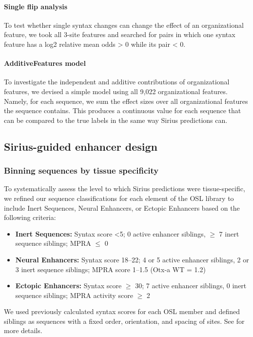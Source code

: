 \paragraph{Single flip analysis}
To test whether single syntax changes can change the effect of an organizational feature, we took all 3-site features and searched for pairs in which one syntax feature has a log2 relative mean odds > 0 while its pair < 0.

\paragraph{AdditiveFeatures model}
To investigate the independent and additive contributions of organizational features, we devised a simple model using all 9,022 organizational features. Namely, for each sequence, we sum the effect sizes over all organizational features the sequence contains. This produces a continuous value for each sequence that can be compared to the true labels in the same way Sirius predictions can.

\subsection{Sirius-guided enhancer design}

\subsubsection{Binning sequences by tissue specificity}
To systematically assess the level to which Sirius predictions were tissue-specific, we refined our sequence classifications for each element of the OSL library to include Inert Sequences, Neural Enhancers, or Ectopic Enhancers based on the following criteria:

\begin{itemize}
  \item \textbf{Inert Sequences:} Syntax score \textless 5; 0 active enhancer siblings, \(\geq\) 7 inert sequence siblings; MPRA \(\leq\) 0
  \item \textbf{Neural Enhancers:} Syntax score 18--22; 4 or 5 active enhancer siblings, 2 or 3 inert sequence siblings; MPRA score 1--1.5 (Otx-a WT = 1.2)
  \item \textbf{Ectopic Enhancers:} Syntax score \(\geq\) 30; 7 active enhancer siblings, 0 inert sequence siblings; MPRA activity score \(\geq\) 2
\end{itemize}

We used previously calculated syntax scores for each OSL member and defined siblings as sequences with a fixed order, orientation, and spacing of sites. See \cite{Solvason2024-gi} for more details.

